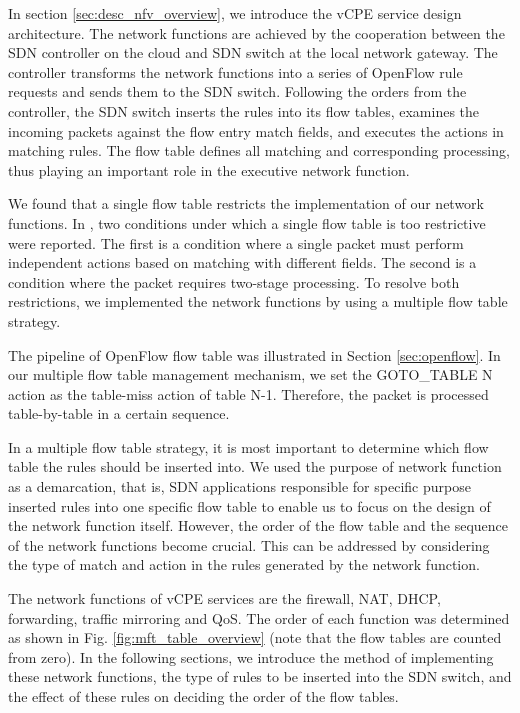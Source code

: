 In section \ref{sec:desc_nfv_overview}, we introduce the vCPE service design architecture.
The network functions are achieved by the cooperation between the SDN controller on the cloud and SDN switch at the local network gateway.
The controller transforms the network functions into a series of OpenFlow rule requests and sends them to the SDN switch.
Following the orders from the controller, the SDN switch inserts the rules into its flow tables, examines the incoming packets against the flow entry match fields, and executes the actions in matching rules.
The flow table \cite{sdn-ft} defines all matching and corresponding processing, thus playing an important role in the executive network function.

We found that a single flow table restricts the implementation of our network functions.
In \cite{multiple-flow-table}, two conditions under which a single flow table is too restrictive were reported.
The first is a condition where a single packet must perform independent actions based on matching with different fields.
The second is a condition where the packet requires two-stage processing.
To resolve both restrictions, we implemented the network functions by using a multiple flow table strategy.

The pipeline of OpenFlow flow table was illustrated in Section \ref{sec:openflow}.
In our multiple flow table management mechanism, we set the GOTO\_TABLE N action as the table-miss action of table N-1. Therefore, the packet is processed table-by-table in a certain sequence.

In a multiple flow table strategy, it is most important to determine which flow table the rules should be inserted into.
We used the purpose of network function as a demarcation, that is, SDN applications responsible for specific purpose inserted rules into one specific flow table to enable us to focus on the design of the network function itself.
However, the order of the flow table and the sequence of the network functions become crucial.
This can be addressed by considering the type of match and action in the rules generated by the network function.

The network functions of vCPE services are the firewall, NAT, DHCP, forwarding, traffic mirroring and QoS.
The order of each function was determined as shown in Fig. \ref{fig:mft_table_overview} (note that the flow tables are counted from zero).
In the following sections, we introduce the method of implementing these network functions, the type of rules to be inserted into the SDN switch, and the effect of these rules on deciding the order of the flow tables.



